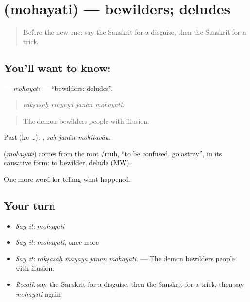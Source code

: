 \section[\texorpdfstring{\sk{मोहयति} (mohayati)}{मोहयति (mohayati)}]{ (mohayati) — bewilders; deludes}

\label{lesson:SA-C335-mohayati}



\begin{quote}
Before the new one: say the Sanskrit for a disguise, then the Sanskrit for a trick.
\end{quote}

\subsection*{You'll want to know: }
\textbf{} — \emph{mohayati} — \textquotedblleft{}bewilders; deludes\textquotedblright{}.

\begin{quote}
   
\end{quote}

\begin{quote}
\emph{rākṣasaḥ māyayā janān mohayati.}
\end{quote}

\begin{quote}
The demon bewilders people with illusion.
\end{quote}

Past (he …):   , \emph{saḥ janān mohitavān}.

\begin{cousinweb}
\textbf{} (\emph{mohayati}) comes from the root √muh, \textquotedblleft{}to be confused, go astray\textquotedblright{}, in its causative form: to bewilder, delude (MW).
\end{cousinweb}

\begin{grammarlens}[title={What you've built}]
One more word for telling what happened.
\end{grammarlens}

\subsection*{Your turn}
\begin{itemize}
\raggedright
  \item \emph{Say it:} \emph{mohayati}
  \item \emph{Say it:} \emph{mohayati}, once more
  \item \emph{Say it:} \emph{rākṣasaḥ māyayā janān mohayati.} — The demon bewilders people with illusion.
  \item \emph{Recall:} say the Sanskrit for a disguise, then the Sanskrit for a trick, then say \emph{mohayati} again
\end{itemize}

